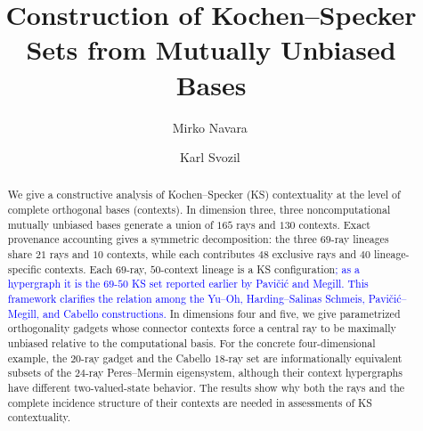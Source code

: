 \documentclass[%
  reprint,
  superscriptaddress,
  showkeys,
  amsmath,amssymb,
  aps,pra,
  longbibliography,
  floatfix,
  x11names
]{revtex4-2}
\DeclareRobustCommand{\chg}[1]{\textcolor{blue}{#1}}
\begin{document}
\title{Construction of Kochen--Specker Sets from Mutually Unbiased Bases}

\author{Mirko Navara\,}


\author{Karl Svozil\,}


\begin{abstract}
We give a constructive analysis of Kochen--Specker (KS) contextuality at the level of complete orthogonal bases (contexts). In dimension three, three noncomputational mutually unbiased bases generate a union of $165$ rays and $130$ contexts. Exact provenance accounting gives a symmetric decomposition: the three $69$-ray lineages share $21$ rays and $10$ contexts, while each contributes $48$ exclusive rays and $40$ lineage-specific contexts. Each $69$-ray, $50$-context lineage is a KS configuration\chg{; as a hypergraph it is the $69$-$50$ KS set reported earlier by Pavi\v{c}i\'{c} and Megill. This framework clarifies the relation among the Yu--Oh, Harding--Salinas Schmeis, Pavi\v{c}i\'{c}--Megill, and Cabello constructions.} In dimensions four and five, we give parametrized orthogonality gadgets whose connector contexts force a central ray to be maximally unbiased relative to the computational basis. For the concrete four-dimensional example, the $20$-ray gadget and the Cabello $18$-ray set are informationally equivalent subsets of the $24$-ray Peres--Mermin eigensystem, although their context hypergraphs have different two-valued-state behavior. The results show why both the rays and the complete incidence structure of their contexts are needed in assessments of KS contextuality.
\end{abstract}


\maketitle
\end{document}
